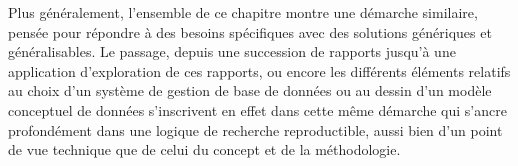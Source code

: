 Plus généralement, l'ensemble de ce chapitre montre une démarche similaire, pensée pour répondre à des besoins spécifiques avec des solutions génériques et généralisables.
Le passage, depuis une succession de rapports jusqu'à une application d'exploration de ces rapports, ou encore les différents éléments relatifs au choix d'un système de gestion de base de données ou au dessin d'un modèle conceptuel de données s'inscrivent en effet dans cette même démarche qui s'ancre profondément dans une logique de recherche reproductible, aussi bien d'un point de vue technique que de celui du concept et de la méthodologie.